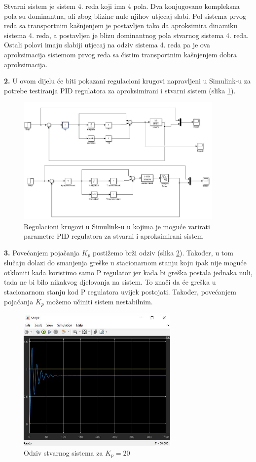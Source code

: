 Stvarni sistem je sistem 4. reda koji ima 4 pola. Dva konjugovano kompleksna pola su dominantna, ali zbog blizine nule njihov utjecaj slabi. Pol sistema prvog reda sa transportnim kašnjenjem je postavljen tako da aproksimira dinamiku sistema 4. reda, a postavljen je blizu dominantnog pola stvarnog sistema 4. reda. Ostali polovi imaju slabiji utjecaj na odziv sistema 4. reda pa je ova aproksimacija sistemom prvog reda sa čistim transportnim kašnjenjem dobra aproksimacija.

\textbf{2.} U ovom dijelu će biti pokazani regulacioni krugovi napravljeni u Simulink-u za potrebe testiranja PID regulatora za aproksimirani i stvarni sistem (slika \ref{fig:z1_6}).
 
  \begin{figure} [H]
  \centering
  \includegraphics[width=0.9\textwidth]{z1_6}
  \caption{Regulacioni krugovi u Simulink-u u kojima je moguće varirati parametre PID regulatora za stvarni i aproksimirani sistem}
  \label{fig:z1_6}
\end{figure}
 
 \textbf{3.} 	Povećanjem pojačanja $K_p$ postižemo brži odziv (slika \ref{fig:z1_7}). Također, u tom slučaju dolazi do smanjenja greške u stacionarnom stanju koju ipak nije moguće otkloniti kada koristimo samo P regulator jer kada bi greška postala jednaka nuli, tada ne bi bilo nikakvog djelovanja na sistem. To znači da će greška u stacionarnom stanju kod P regulatora uvijek postojati. Također, povećanjem pojačanja $K_p$ možemo učiniti sistem nestabilnim.
 
 \begin{figure} [H]
  \centering
  \includegraphics[width=0.7\textwidth]{z1_7}
  \caption{Odziv stvarnog sistema za $K_p=20$}
  \label{fig:z1_7}
\end{figure}


